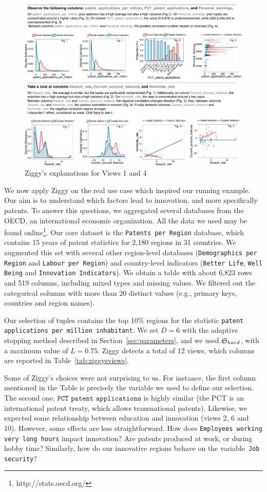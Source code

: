 \begin{figure}[!ht]
  \centering
  \includegraphics[width=2\columnwidth]{Figures/UseCase}
  \caption{Ziggy's explanations for Views 1 and 4}
  \label{pic:zigdetail}
\end{figure}
We now apply Ziggy on the real use case which inspired our running example.
Our aim is to understand which factors lead to innovation, and more
specifically patents.  To answer this questions, we aggregated several
databases from the OECD, an international economic organization. All the data
we used may be found online\footnote{http://stats.oecd.org/}. Our core dataset
is the \texttt{Patents per Region} database, which contains 15 years of patent
statistics for 2,180 regions in 31 countries. We augmented this set with
several other region-level databases (\texttt{Demographics per Region} and
\texttt{Labour per Region}) and country-level indicators (\texttt{Better Life},
\texttt{Well Being} and \texttt{Innovation Indicators}).  We obtain a table
with about 6,823 rows and 519 columns, including mixed types and missing
values. We filtered out the categorical columns with more than 20 distinct
values (e.g., primary keys, countries and region names). 

Our selection of tuples contains the top 10\% regions for the statistic
\texttt{patent applications per million inhabitant}. We set $D=6$ with the
adaptive stopping method described in Section~\ref{sec:parameters}, and we used
$\mathfrak{S}_{hard}$, with a maximum value of $L=0.75$.  Ziggy detects a total of 12
views, which columns are reported in Table~\ref{tab:ziggysviews}.

Some of Ziggy's choices were not surprising to us. For instance, the first
column mentioned in the Table is precisely the variable we used to define our
selection. The second one, $\texttt{PCT patent applications}$ is highly similar
(the PCT is an international patent treaty, which allows transnational
patents). Likewise, we expected some relationship between education and
innovation (views 2, 6 and 10). However, some effects are less straightforward.
How does \texttt{Employees working very long\- hours} impact innovation? Are
patents produced at work, or during hobby time? Similarly, how do our
innovative regions behave on the variable~\texttt{Job security}?

